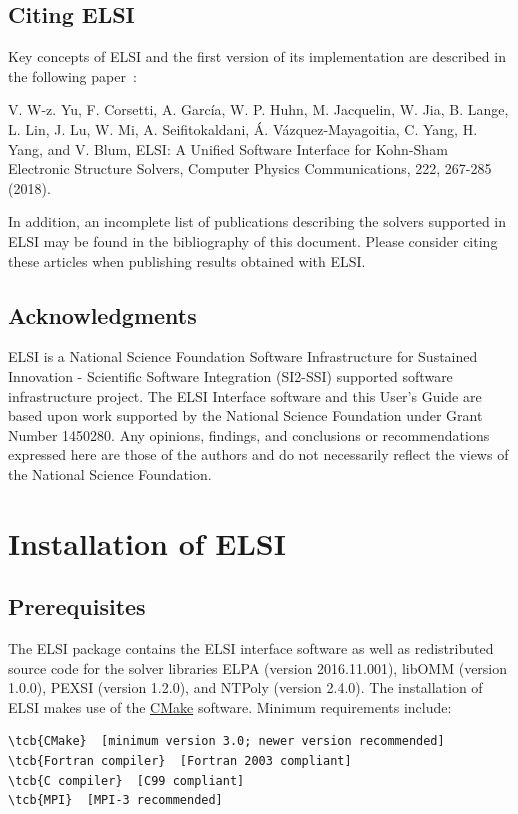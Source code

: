 \documentclass{report}
\newcommand{\tcb}[1]{\textcolor{blue}{#1}}
\begin{document}
\section{Citing ELSI}
\label{sec:cite}
Key concepts of ELSI and the first version of its implementation are described in the following paper~\cite{elsi_yu_2018}:

V. W-z. Yu, F. Corsetti, A. Garc\'{i}a, W. P. Huhn, M. Jacquelin, W. Jia, B. Lange, L. Lin, J. Lu, W. Mi, A. Seifitokaldani, \'{A}. V\'{a}zquez-Mayagoitia, C. Yang, H. Yang, and V. Blum, ELSI: A Unified Software Interface for Kohn-Sham Electronic Structure Solvers, Computer Physics Communications, 222, 267-285 (2018).

In addition, an incomplete list of publications describing the solvers supported in ELSI may be found in the bibliography of this document. Please consider citing these articles when publishing results obtained with ELSI.

\section{Acknowledgments}
\label{sec:thanks}
ELSI is a National Science Foundation Software Infrastructure for Sustained Innovation - Scientific Software Integration (SI2-SSI) supported software infrastructure project. The ELSI Interface software and this User's Guide are based upon work supported by the National Science Foundation under Grant Number 1450280. Any opinions, findings, and conclusions or recommendations expressed here are those of the authors and do not necessarily reflect the views of the National Science Foundation.

\chapter{Installation of ELSI}
\section{Prerequisites}
\label{sec:prereq}
The ELSI package contains the ELSI interface software as well as redistributed source code for the solver libraries ELPA (version 2016.11.001), libOMM (version 1.0.0), PEXSI (version 1.2.0), and NTPoly (version 2.4.0). The installation of ELSI makes use of the \href{http://cmake.org}{CMake} software. Minimum requirements include:
\begin{Verbatim}[commandchars=\\\{\}]
\tcb{CMake}  [minimum version 3.0; newer version recommended]
\tcb{Fortran compiler}  [Fortran 2003 compliant]
\tcb{C compiler}  [C99 compliant]
\tcb{MPI}  [MPI-3 recommended]
\end{Verbatim}
\end{document}
